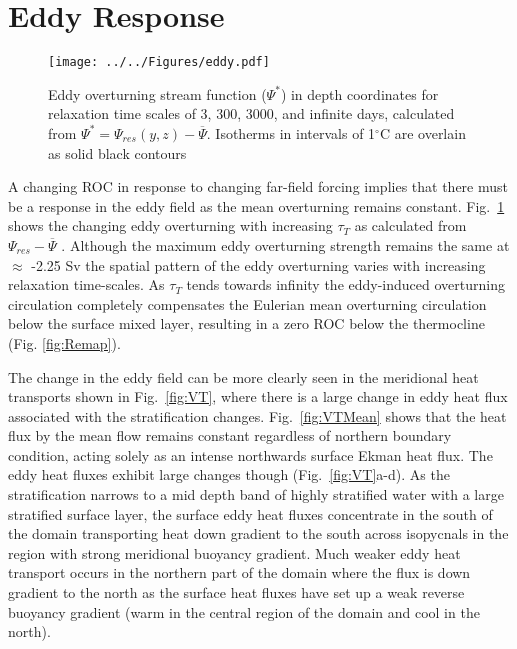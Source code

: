 \section{Eddy Response}
\begin{figure}
\noindent \texttt{[image: ../../Figures/eddy.pdf]} 
\caption{Eddy overturning stream function ($\Psi ^*$) in depth coordinates for relaxation time scales of 3, 300, 3000, and infinite days, calculated from $\Psi ^* = \Psi_{res}(y,z)-\overline{\Psi}$. Isotherms in intervals of 1$^{\circ}$C are overlain as solid black contours}\label{fig:EOC}
\end{figure}
A changing ROC in response to changing far-field forcing implies that there must be a response in the eddy field as the mean overturning remains constant. Fig.~\ref{fig:EOC} shows the changing eddy overturning with increasing $\tau_T$ as calculated from $\Psi_{res}-\overline{\Psi}$ . Although the maximum eddy overturning strength remains the same at $\approx$ -2.25 Sv the spatial pattern of the eddy overturning varies with increasing relaxation time-scales. As $\tau_T$ tends towards infinity the eddy-induced overturning circulation completely compensates the Eulerian mean overturning circulation below the surface mixed layer, resulting in a zero ROC below the thermocline (Fig. \ref{fig:Remap}). 

The change in the eddy field can be more clearly seen in the meridional heat transports shown in Fig.~\ref{fig:VT}, where there is a large change in eddy heat flux associated with the stratification changes. Fig.~\ref{fig:VTMean} shows that the heat flux by the mean flow remains constant regardless of northern boundary condition, acting solely as an intense northwards surface Ekman heat flux. The eddy heat fluxes exhibit large changes though (Fig.~\ref{fig:VT}a-d). As the stratification narrows to a mid depth band of highly stratified water with a large stratified surface layer, the surface eddy heat fluxes concentrate in the south of the domain transporting heat down gradient to the south across isopycnals in the region with strong meridional buoyancy gradient. Much weaker eddy heat transport occurs in the northern part of the domain where the flux is down gradient to the north as the surface heat fluxes have set up a weak reverse buoyancy gradient (warm in the central region of the domain and cool in the north). 

